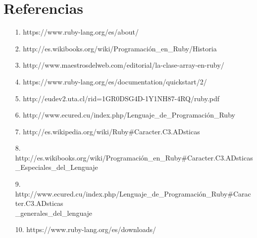 \documentclass[11pt]{article} %
\begin{document}
\newpage
\section{\fontsize{14}{0} \bf Referencias}
\begin{itemize}
          \item [1.] https://www.ruby-lang.org/es/about/ \\
          \item [2.] http://es.wikibooks.org/wiki/Programación\_en\_Ruby/Historia\\
	\item[3.]  http://www.maestrosdelweb.com/editorial/la-clase-array-en-ruby/\\
	\item[4.] https://www.ruby-lang.org/es/documentation/quickstart/2/\\
	\item[5.] http://eudev2.uta.cl/rid=1GR0DSG4D-1Y1NH87-4RQ/ruby.pdf\\
	\item[6.] http://www.ecured.cu/index.php/Lenguaje\_de\_Programación\_Ruby\\
	\item[7.]  http://es.wikipedia.org/wiki/Ruby\#Caracter.C3.ADsticas \\
	\item[8.]  http://es.wikibooks.org/wiki/Programación\_en\_Ruby\#Caracter.C3.ADsticas\\
\_Especiales\_del\_Lenguaje \\
	 \item[9.] http://www.ecured.cu/index.php/Lenguaje\_de\_Programación\_Ruby\#Caracter.C3.ADsticas\\
\_generales\_del\_lenguaje \\
	\item[10.] https://www.ruby-lang.org/es/downloads/

\end{itemize}
\end{document}
